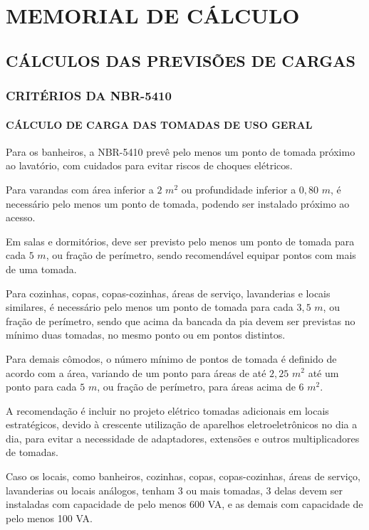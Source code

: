 \chapter[MEMORIAL DE CÁLCULO]{MEMORIAL DE CÁLCULO}

\section{CÁLCULOS DAS PREVISÕES DE CARGAS}

\subsection{CRITÉRIOS DA NBR-5410}
\label{criterios_carga_nbr}
\subsubsection{CÁLCULO DE CARGA DAS TOMADAS DE USO GERAL}

Para os banheiros, a NBR-5410 prevê pelo menos um ponto de tomada próximo ao lavatório, com cuidados para evitar riscos de choques elétricos.

Para varandas com área inferior a $2$ $m^2$ ou profundidade inferior a $0,80$ $m$, é necessário pelo menos um ponto de tomada, podendo ser instalado próximo ao acesso.

Em salas e dormitórios, deve ser previsto pelo menos um ponto de tomada para cada $5$ $m$, ou fração de perímetro, sendo recomendável equipar pontos com mais de uma tomada.

Para cozinhas, copas, copas-cozinhas, áreas de serviço, lavanderias e locais similares, é necessário pelo menos um ponto de tomada para cada $3,5$ $m$, ou fração de perímetro, sendo que acima da bancada da pia devem ser previstas no mínimo duas tomadas, no mesmo ponto ou em pontos distintos.

Para demais cômodos, o número mínimo de pontos de tomada é definido de acordo com a área, variando de um ponto para áreas de até $2,25$ $m^2$ até um ponto para cada $5$ $m$, ou fração de perímetro, para áreas acima de $6$ $m^2$.

A recomendação é incluir no projeto elétrico tomadas adicionais em locais estratégicos, devido à crescente utilização de aparelhos eletroeletrônicos no dia a dia, para evitar a necessidade de adaptadores, extensões e outros multiplicadores de tomadas.

Caso os locais, como banheiros, cozinhas, copas, copas-cozinhas, áreas de serviço, lavanderias ou locais análogos, tenham 3 ou mais tomadas, 3 delas devem ser instaladas com capacidade de pelo menos 600 VA, e as demais com capacidade de pelo menos 100 VA.

